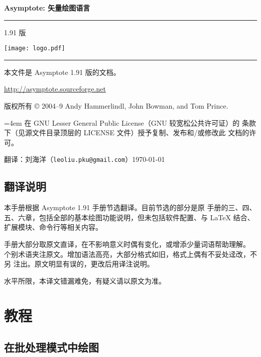 \documentclass[nofonts,CJKnormalspaces]{ctexbook}[2009/05/20]
\newcommand*\prgname[1]{\textsf{#1}}
\newcommand\asyversion{1.91}
\begin{document}
\frontmatter

\begin{titlepage}
\setlength{\parindent}{0pt}
{\Huge\bfseries\prgname{Asymptote}: 矢量绘图语言}

\rule[0pt]{\textwidth}{4pt}

\hfill\asyversion{} 版

\centerline{\texttt{[image: logo.pdf]}}

\rule[0pt]{\textwidth}{2pt}

本文件是 \prgname{Asymptote} \asyversion{} 版的文档。

\url{http://asymptote.sourceforge.net}

版权所有 \copyright{} 2004--9 Andy Hammerlindl, John Bowman, and Tom Prince.

{\leftskip=4em 在 GNU Lesser General Public License（GNU 较宽松公共许可证）的
条款下（见源文件目录顶层的 \prgname{LICENSE} 文件）授予复制、发布和/或修改此
文档的许可。\par}

翻译：刘海洋（\nolinkurl{leoliu.pku@gmail.com}）\qquad\today
\end{titlepage}

\section*{翻译说明}

本手册根据 \prgname{Asymptote \asyversion} 手册节选翻译。目前节选的部分是原
手册的三、四、五、六章，包括全部的基本绘图功能说明，但未包括软件配置、与
\LaTeX{} 结合、扩展模块、命令行等相关内容。

手册大部分取原文直译，在不影响意义时偶有变化，或增添少量词语帮助理解。
个别术语夹注原文。增加语法高亮，大部分格式如旧，格式上偶有不妥处迳改，不另
注出。原文明显有误的，更改后用译注说明。

水平所限，本译文错漏难免，有疑义请以原文为准。


\tableofcontents

\mainmatter
\setcounter{chapter}{2}

\chapter{教程}
\label{chap:tutorial}

\section{在批处理模式中绘图}
\end{document}
